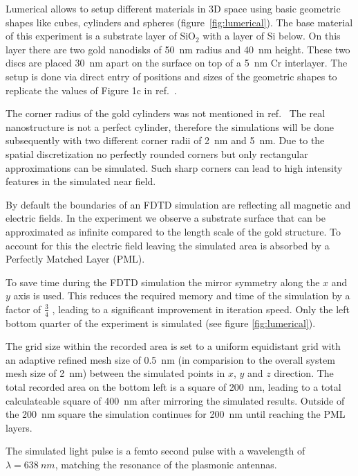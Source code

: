 Lumerical allows to setup different materials in 3D space using basic geometric shapes like cubes, cylinders and spheres (figure~\ref{fig:lumerical}). The base material of this experiment is a substrate layer of SiO$_2$ with a layer of Si below. On this layer there are two gold nanodisks of \SI{50}{nm} radius and \SI{40}{nm} height. These two discs are placed \SI{30}{nm} apart on the surface on top of a \SI{5}{nm} Cr interlayer. The setup is done via direct entry of positions and sizes of the geometric shapes to replicate the values of Figure 1c in ref.~\cite{heeg}.

The corner radius of the gold cylinders was not mentioned in ref.~\cite{heeg} The real nanostructure is not a perfect cylinder, therefore the simulations will be done subsequently with two different corner radii of \SI{2}{nm} and \SI{5}{nm}. Due to the spatial discretization no perfectly rounded corners but only rectangular approximations can be simulated. Such sharp corners can lead to high intensity features in the simulated near field.

By default the boundaries of an FDTD simulation are reflecting all magnetic and electric fields. In the experiment we observe a substrate surface that can be approximated as infinite compared to the length scale of the gold structure. To account for this the electric field leaving the simulated area is absorbed by a Perfectly Matched Layer (PML).

To save time during the FDTD simulation the mirror symmetry along the $x$ and $y$ axis is used. This reduces the required memory and time of the simulation by a factor of $\frac{3}{4}$ , leading to a significant improvement in iteration speed. Only the left bottom quarter of the experiment is simulated (see figure \ref{fig:lumerical}).

The grid size within the recorded area is set to a uniform equidistant grid with an adaptive refined mesh size of \SI{0.5}{nm} (in comparision to the overall system mesh size of \SI{2}{nm}) between the simulated points in $x$, $y$ and $z$ direction. The total recorded area on the bottom left is a square of \SI{200}{nm}, leading to a total calculateable square of \SI{400}{nm} after mirroring the simulated results. Outside of the \SI{200}{nm} square the simulation continues for \SI{200}{nm} until reaching the PML layers.

The simulated light pulse is a femto second pulse with a wavelength of $\lambda=\SI{638}{nm}$, matching the resonance of the plasmonic antennas\cite{heeg}.

